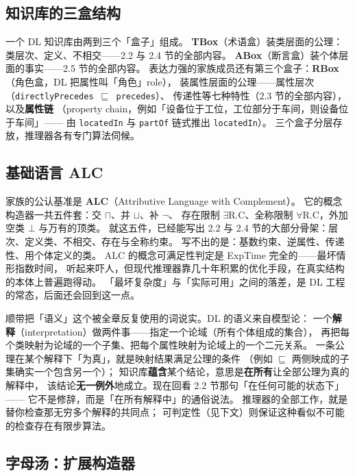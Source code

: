 \subsection{知识库的三盒结构}

一个 DL 知识库由两到三个「盒子」组成。
\textbf{TBox}（术语盒）装类层面的公理：类层次、定义、不相交——2.2 与 2.4 节的全部内容。
\textbf{ABox}（断言盒）装个体层面的事实——2.5 节的全部内容。
表达力强的家族成员还有第三个盒子：\textbf{RBox}（角色盒，DL 把属性叫「角色」role），
装属性层面的公理——属性层次（\texttt{directlyPrecedes \(\sqsubseteq\) precedes}）、
传递性等七种特性（2.3 节的全部内容），以及\textbf{属性链}
（property chain，例如「设备位于工位，工位部分于车间，则设备位于车间」——
由 \texttt{locatedIn} 与 \texttt{partOf} 链式推出 \texttt{locatedIn}）。
三个盒子分层存放，推理器各有专门算法伺候。

\subsection{基础语言 ALC}

家族的公认基准是 \textbf{ALC}（Attributive Language with Complement）。
它的概念构造器一共五件套：交 \(\sqcap\)、并 \(\sqcup\)、补 \(\lnot\)、
存在限制 \(\exists\)R.C、全称限制 \(\forall\)R.C，外加空类 \(\bot\) 与万有的顶类。
就这五件，已经能写出 2.2 与 2.4 节的大部分骨架：层次、定义类、不相交、存在与全称约束。
写不出的是：基数约束、逆属性、传递性、用个体定义的类。
ALC 的概念可满足性判定是 ExpTime 完全的——最坏情形指数时间，
听起来吓人，但现代推理器靠几十年积累的优化手段，在真实结构的本体上普遍跑得动。
「最坏复杂度」与「实际可用」之间的落差，是 DL 工程的常态，后面还会回到这一点。

顺带把「语义」这个被全章反复使用的词说实。DL 的语义来自模型论：
一个\textbf{解释}（interpretation）做两件事——指定一个论域（所有个体组成的集合），
再把每个类映射为论域的一个子集、把每个属性映射为论域上的一个二元关系。
一条公理在某个解释下「为真」，就是映射结果满足公理的条件
（例如 \(\sqsubseteq\) 两侧映成的子集确实一个包含另一个）；
知识库\textbf{蕴含}某个结论，意思是\textbf{在所有}让全部公理为真的解释中，
该结论\textbf{无一例外}地成立。现在回看 2.2 节那句「在任何可能的状态下」——
它不是修辞，而是「在所有解释中」的通俗说法。
推理器的全部工作，就是替你检查那无穷多个解释的共同点；
可判定性（见下文）则保证这种看似不可能的检查存在有限步算法。

\subsection{字母汤：扩展构造器}

